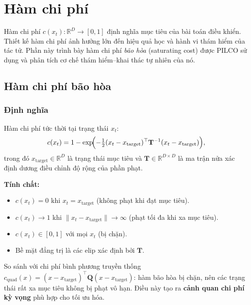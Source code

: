 \section{Hàm chi phí}
\label{SEC_cost}

Hàm chi phí $c(x_t): \mathbb{R}^D \to [0,1]$ định nghĩa mục tiêu của bài toán điều khiển. Thiết kế hàm chi phí ảnh hưởng lớn đến hiệu quả học và hành vi thám hiểm của tác tử. Phần này trình bày hàm chi phí \textit{bão hòa} (saturating cost) được PILCO sử dụng và phân tích cơ chế thám hiểm--khai thác tự nhiên của nó.

\subsection{Hàm chi phí bão hòa}
\label{SUB_SEC_saturating_cost}

\subsubsection{Định nghĩa}
\label{SUB_SUB_SEC_cost_def}

Hàm chi phí tức thời tại trạng thái $x_t$:
\begin{equation}
    c(x_t) = 1 - \exp\!\Bigl(-\tfrac{1}{2}(x_t - x_{\mathrm{target}})^\top \mathbf{T}^{-1} (x_t - x_{\mathrm{target}})\Bigr),
    \label{saturating_cost}
\end{equation}
trong đó $x_{\mathrm{target}} \in \mathbb{R}^D$ là trạng thái mục tiêu và $\mathbf{T} \in \mathbb{R}^{D \times D}$ là ma trận nửa xác định dương điều chỉnh độ rộng của phần phạt.

\textbf{Tính chất:}
\begin{itemize}
    \item $c(x_t) = 0$ khi $x_t = x_{\mathrm{target}}$ (không phạt khi đạt mục tiêu).
    \item $c(x_t) \to 1$ khi $\|x_t - x_{\mathrm{target}}\| \to \infty$ (phạt tối đa khi xa mục tiêu).
    \item $c(x_t) \in [0, 1]$ với mọi $x_t$ (bị chặn).
    \item Bề mặt đẳng trị là các elip xác định bởi $\mathbf{T}$.
\end{itemize}

So sánh với chi phí bình phương truyền thống $c_{\mathrm{quad}}(x) = (x - x_{\mathrm{target}})^\top \mathbf{Q} (x - x_{\mathrm{target}})$: hàm bão hòa bị chặn, nên các trạng thái rất xa mục tiêu không bị phạt vô hạn. Điều này tạo ra \textbf{cảnh quan chi phí kỳ vọng} phù hợp cho tối ưu hóa.

